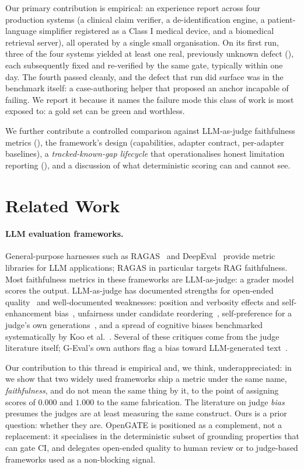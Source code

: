 \documentclass[11pt,a4paper]{article}
\begin{document}
Our primary contribution is empirical: an experience report across four production systems
(a clinical claim verifier, a de-identification engine, a patient-language simplifier registered as a
Class I medical device, and a biomedical retrieval server), all operated by a single small
organisation. On its first run, three of the four systems yielded at least one real, previously
unknown defect (), each subsequently fixed and re-verified by the same gate,
typically within one day. The fourth passed cleanly, and the defect that run did surface was in the
benchmark itself: a case-authoring helper that proposed an anchor incapable of failing. We report it because it names the failure mode this class of work is most exposed to: a gold set
can be green and worthless.

We further contribute a controlled comparison against LLM-as-judge faithfulness metrics
(), the framework's design (capabilities, adapter contract, per-adapter baselines), a
\emph{tracked-known-gap lifecycle} that operationalises honest limitation reporting
(), and a discussion of what deterministic scoring can and cannot see.

\section{Related Work}

\paragraph{LLM evaluation frameworks.}
General-purpose harnesses such as RAGAS~\cite{es2024ragas} and DeepEval~\cite{ip2026deepeval}
provide metric libraries for LLM applications; RAGAS in particular targets RAG faithfulness. Most
faithfulness metrics in these frameworks are LLM-as-judge: a grader model scores the output.
LLM-as-judge has documented strengths for open-ended quality~\cite{zheng2023judging,liu2023geval} and
well-documented weaknesses: position and verbosity effects and self-enhancement
bias~\cite{zheng2023judging}, unfairness under candidate reordering~\cite{wang2024unfair},
self-preference for a judge's own generations~\cite{panickssery2024selfpref}, and a spread of
cognitive biases benchmarked systematically by Koo et al.~\cite{koo2024biases}. Several of these
critiques come from the judge literature itself; G-Eval's own authors flag a bias toward
LLM-generated text~\cite{liu2023geval}.

Our contribution to this thread is empirical and, we think, underappreciated: in
 we show that two widely used frameworks ship a metric under the same name,
\emph{faithfulness}, and do not mean the same thing by it, to the point of assigning scores of
$0.000$ and $1.000$ to the same fabrication. The literature on judge \emph{bias} presumes the
judges are at least measuring the same construct. Ours is a prior question: whether they are.
OpenGATE is positioned as a complement, not a replacement: it specialises in the deterministic
subset of grounding properties that can gate CI, and delegates open-ended quality to human review or
to judge-based frameworks used as a non-blocking signal.
\end{document}
